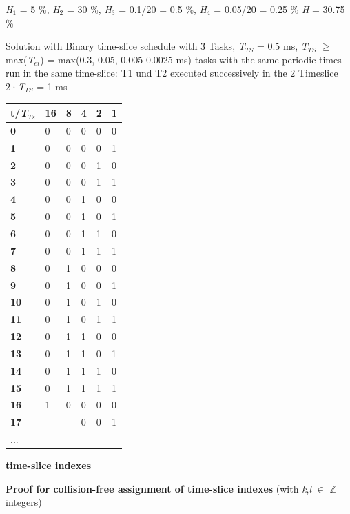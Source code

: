 \textit{H}${}_{1}$ = 5 \%, \textit{H}${}_{2}$ = 30 \%, \textit{H}${}_{3}$ = 0.1/20 = 0.5 \%, \textit{H}${}_{4}$ = 0.05/20 = 0.25 \%  \textit{H} = 30.75 \%

Solution with Binary time-slice schedule with 3 Tasks, \textit{T${}_{TS}$} = 0.5 ms, \textit{T${}_{TS}$} $\mathrm{\ge}$ max(\textit{T${}_{ei}$}) = max(0.3, 0.05, 0.005 0.0025 ms) tasks with the same periodic times run in the same time-slice: T1 und T2 executed successively in the 2 Timeslice 2·\textit{T${}_{TS}$ }= 1 ms

\begin{tabular}{|p{0.2in}|p{0.2in}|p{0.1in}|p{0.1in}|p{0.1in}|p{0.1in}|} \hline 
\textbf{t/\textit{T${}_{Ts}$}} & \textbf{16} & \textbf{8} & \textbf{4} & \textbf{2} & \textbf{1} \\ \hline 
\textbf{0} & 0 & 0 & 0 & 0 & 0 \\ \hline 
\textbf{1} & 0 & 0 & 0 & 0 & 1 \\ \hline 
\textbf{2} & 0 & 0 & 0 & 1 & 0 \\ \hline 
\textbf{3} & 0 & 0 & 0 & 1 & 1 \\ \hline 
\textbf{4} & 0 & 0 & 1 & 0 & 0 \\ \hline 
\textbf{5} & 0 & 0 & 1 & 0 & 1 \\ \hline 
\textbf{6} & 0 & 0 & 1 & 1 & 0 \\ \hline 
\textbf{7} & 0 & 0 & 1 & 1 & 1 \\ \hline 
\textbf{8} & 0 & 1 & 0 & 0 & 0 \\ \hline 
\textbf{9} & 0 & 1 & 0 & 0 & 1 \\ \hline 
\textbf{10} & 0 & 1 & 0 & 1 & 0 \\ \hline 
\textbf{11} & 0 & 1 & 0 & 1 & 1 \\ \hline 
\textbf{12} & 0 & 1 & 1 & 0 & 0 \\ \hline 
\textbf{13} & 0 & 1 & 1 & 0 & 1 \\ \hline 
\textbf{14} & 0 & 1 & 1 & 1 & 0 \\ \hline 
\textbf{15} & 0 & 1 & 1 & 1 & 1 \\ \hline 
\textbf{16} & 1 & 0 & 0 & 0 & 0 \\ \hline 
\textbf{17} &  &  & 0 & 0 & 1 \\ \hline 
... &  &  &  &  &  \\ \hline 
\end{tabular}

\textbf{time-slice indexes}


\textbf{Proof for collision-free assignment of time-slice indexes } (with \textit{k},\textit{l} $\in$ \textbf{$\boldsymbol{\mathbb{Z}}$}  integers)

